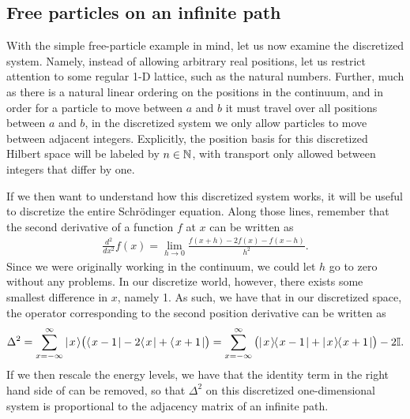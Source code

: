\documentclass[../thesis-main/thesis-main]{subfiles}
\begin{document}
\subsection{Free particles on an infinite path}

With the simple free-particle example in mind, let us now examine the discretized system.  Namely, instead of allowing arbitrary real positions, let us restrict attention to some regular 1-D lattice, such as the natural numbers.  Further, much as there is a natural linear ordering on the positions in the continuum, and in order for a particle to move between $a$ and $b$ it must travel over all positions between $a$ and $b$, in the discretized system we only allow particles to move between adjacent integers.  Explicitly, the position basis for this discretized Hilbert space will be labeled by $n\in \mathbb{N}$, with transport only allowed between integers that differ by one.

If we then want to understand how this discretized system works, it will be useful to discretize the entire Schr\"{o}dinger equation.  Along those lines, remember that the second derivative of a function $f$ at $x$ can be written as
\begin{align}
  \frac{d^2}{dx^2} f(x) = \lim_{h\rightarrow 0} \frac{f(x+h) - 2 f(x) - f(x-h)}{h^2}.
\end{align}
Since we were originally working in the continuum, we could let $h$ go to zero without any problems.  In our discretize world, however, there exists some smallest difference in $x$, namely 1.  As such, we have that in our discretized space, the operator corresponding to the second position derivative can be written as
\begin{equation}
  \Delta^2 = \sum_{x=-\infty}^\infty |\mspace{2mu} x \mspace{2mu} \rangle \big(\langle\mspace{2mu} x-1 \mspace{2mu} | - 2 \langle\mspace{2mu} x \mspace{2mu} | + \langle\mspace{2mu} x+1 \mspace{2mu} |\big) = \sum_{x=-\infty}^\infty \big(|\mspace{2mu} x \mspace{2mu} \rangle\mspace{-2mu}\langle\mspace{2mu} x-1 \mspace{2mu} | + |\mspace{2mu} x \mspace{2mu} \rangle\mspace{-2mu}\langle\mspace{2mu} x+1 \mspace{2mu} |\big) - 2 \mathbb{I}.
\label{eq:discrete_second_derivative}
\end{equation}
If we then rescale the energy levels, we have that the identity term in the right hand side of  can be removed, so that $\Delta^2$ on this discretized one-dimensional system is proportional to the adjacency matrix of an infinite path.  
\end{document}
